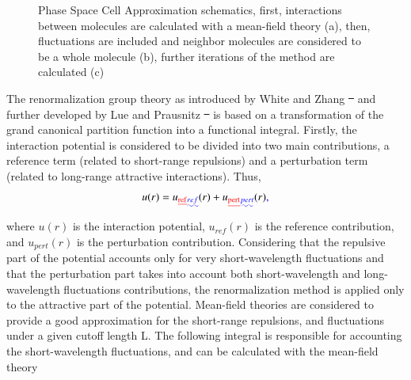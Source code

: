 \documentclass[preprint,12pt,3p]{elsarticle}
\providecommand{\DIFadd}[1]{{\protect\color{blue}\uwave{#1}}} %
\providecommand{\DIFdel}[1]{{\protect\color{red}\sout{#1}}}                      %
\providecommand{\DIFaddbegin}{} %
\providecommand{\DIFaddend}{} %
\providecommand{\DIFdelbegin}{} %
\providecommand{\DIFdelend}{} %
\begin{document}
\begin{figure}[h!]
\centering
\captionsetup{justification=centering}
\caption{Phase Space Cell Approximation schematics, first, interactions between molecules are calculated with a mean-field theory (a), then, fluctuations are included and neighbor molecules are considered to be a whole molecule (b), further iterations of the method are calculated (c)}
\label{fig:schematics}
\end{figure}

	The renormalization group theory as introduced by White and Zhang \DIFdelbegin \DIFdel{~}\DIFdelend \cite{white1993renormalization} and further developed by Lue and Prausnitz \DIFdelbegin \DIFdel{~}\DIFdelend \cite{lue1998renormalization,lue1998brenormalization} is based on a transformation of the grand canonical partition function into a functional integral. Firstly, the interaction potential is considered to be divided into two main contributions, a reference term (related to short-range repulsions) and a perturbation term (related to long-range attractive interactions). Thus,
\begin{equation} \label{eq:u(r)}
    u(r) = u\DIFdelbegin \DIFdel{_\text{ref}}\DIFdelend \DIFaddbegin \DIFadd{_{ref}}\DIFaddend (r) + u\DIFdelbegin \DIFdel{_\text{pert}}\DIFdelend \DIFaddbegin \DIFadd{_{pert}}\DIFaddend (r)\DIFaddbegin \DIFadd{,
}\DIFaddend \end{equation}
    where $u(r)$ is the interaction potential, $u_{ref}(r)$ is the reference contribution, and $u_{pert}(r)$ is the perturbation contribution. Considering that the repulsive part of the potential accounts only for very short-wavelength fluctuations and that the perturbation part takes into account both short-wavelength and long-wavelength fluctuations contributions, the renormalization method is applied only to the attractive part of the potential. Mean-field theories are considered to provide a good approximation for the short-range repulsions, and fluctuations under a given cutoff length L. The following integral is responsible for accounting the short-wavelength fluctuations, and can be calculated with the mean-field theory
	\DIFaddbegin 
\end{document}

